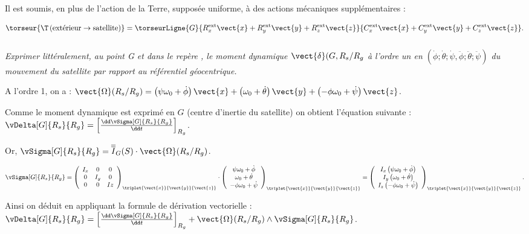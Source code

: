 Il est soumis, en plus de l'action de la Terre, supposée uniforme, à des
actions mécaniques supplémentaires :

$$
\torseur{\T\left(\text{extérieur}\to \text{satellite}\right)}=\torseurLigne{G}{R_x^{\text{ext}}\vect{x}+R_y^{\text{ext}}\vect{y}+R_z^{\text{ext}}\vect{z}}{C_x^{\text{ext}}\vect{x}+C_y^{\text{ext}}\vect{y}+C_z^{\text{ext}}\vect{z}}.
$$

\fi


\subparagraph{\label{q_7}}\textit{Exprimer littéralement, au point G et dans le repère , le moment dynamique $\vect{\delta}(G,R_s/R_g$ à l'ordre un en $\left(\dot{\phi};\dot{\theta};\dot{\psi},\ddot{\phi};\ddot{\theta};\ddot{\psi}\right)$ du mouvement du satellite par rapport au référentiel géocentrique.}
\ifprof
\begin{corrige}

A l'ordre 1, on a : $
\vect{\Omega}(R_s/R_g)=\left(\psi\omega_0+\dot{\phi}\right)\vect{x}+\left(\omega_0+\dot{\theta}\right)\vect{y}+\left(-\phi\omega_0+\dot{\psi}\right)\vect{z}
$.

Comme le moment dynamique est exprimé en $G$ (centre d'inertie du satellite) on obtient l'équation suivante : 
$
\vDelta[G]{R_s}{R_g}=\left[\frac{\dd \vSigma[G]{R_s}{R_g}}{\dd t}\right]_{R_g}
$.


Or, $\vSigma[G]{R_s}{R_g}=\overline{\overline{I}}_G(S)\cdot \vect{\Omega}(R_s/R_g)$.

$$
\vSigma[G]{R_s}{R_g}=\left(
\begin{array}{ccc}
I_x & 0 & 0 \\ 
0 & I_y & 0 \\ 
0 & 0 & Iz
\end{array}
\right)_{\triplet{\vect{x}}{\vect{y}}{\vect{z}}} 
\cdot 
\left(
\begin{array}{c}
\psi\omega_0+\dot{\phi} \\ 
\omega_0+\dot{\theta} \\ 
-\phi\omega_0+\dot{\psi}
\end{array}
\right)_{\triplet{\vect{x}}{\vect{y}}{\vect{z}}} 
=
\left(
\begin{array}{c}
I_x\left(\psi\omega_0+\dot{\phi} \right)\\ 
I_y\left(\omega_0+\dot{\theta} \right)\\ 
I_z\left(-\phi\omega_0+\dot{\psi}\right)
\end{array}
\right)_{\triplet{\vect{x}}{\vect{y}}{\vect{z}}} .
$$

Ainsi on déduit en appliquant la formule de dérivation vectorielle : $
\vDelta[G]{R_s}{R_g}=\left[\frac{\dd \vSigma[G]{R_s}{R_g}}{\dd t}\right]_{R_g}+\vect{\Omega}(R_s/R_g)\wedge  \vSigma[G]{R_s}{R_g}$. 


\end{corrige}
